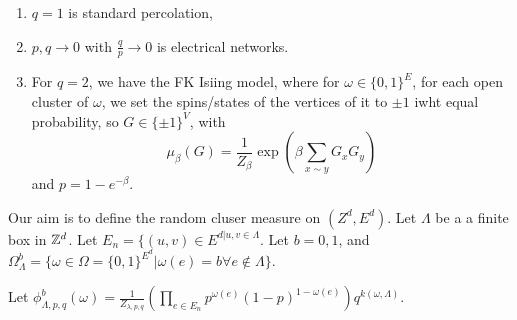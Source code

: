 \begin{enumerate}
\item $q = 1$ is standard percolation,
\item $p, q \rightarrow 0$ with $\frac{q}{p} \rightarrow 0$ is
  electrical networks.
\item For $q = 2$, we have the FK Isiing model, where for $\omega \in
  \{ 0, 1 \}^{E}$, for each open cluster of $\omega$, we set the
  spins/states of the vertices of it to $\pm 1$ iwht equal
  probability, so $G \in \{ \pm 1 \}^{V}$, with
  \begin{equation}
    \label{eq:50}
    \mu_{\beta}(G) = \frac{1}{Z_{\beta}} \exp(\beta \sum_{x \sim y}
    G_{x} G_{y})
  \end{equation} and $p = 1 - e^{-\beta}$.
\end{enumerate}

Our aim is to define the random cluser measure on $(Z^{d}, E^{d})$.
Let $\Lambda$ be a a finite box in $\mathbb{Z}^{d}$.  Let $E_{n} = \{ (u, v)
\in E^{d | u, v \in \Lambda}$.  Let $b = 0, 1$, and
$\Omega_{\Lambda}^{b} = \{ \omega \in \Omega = \{ 0, 1 \}^{E^{d}} |
\omega(e) = b \forall e \notin \Lambda \}$.

Let $\phi_{\Lambda, p, q}^{b}(\omega) = \frac{1}{Z_{\lambda, p,
    q}} (\prod_{e \in E_{n}} p^{\omega(e)} (1-p)^{1 - \omega(e)})
q^{k(\omega,   \Lambda)}$.



